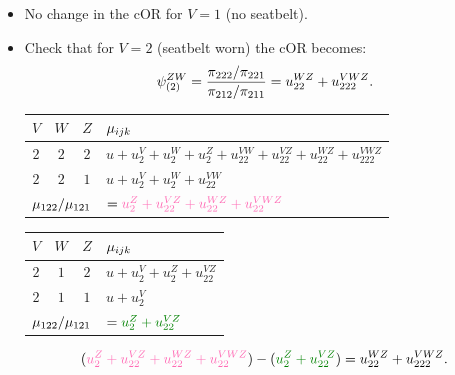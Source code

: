 \documentclass{article}\usepackage[]{graphicx}\usepackage[svgnames]{xcolor}
\let\exp\relax%
\let\log\relax%
\newcommand{\cOR}{\text{cOR}}%
\begin{document}
\begin{itemize}
    \item No change in the $ \cOR $ for $ V=1 $ (no seatbelt).
    \item Check that for $ V=2 $ (seatbelt worn) the $ \cOR $ becomes:
          \[ \psi_{(2)}^{ZW}=\frac{\pi_{222}/\pi_{221}}{\pi_{212}/\pi_{211}}=\exp{u_{22}^{WZ}+u_{222}^{VWZ}}. \]
          \begin{table}[H]
              \centering
              \begin{tabular}{cccl}
                  $ V $                                           & $ W $                                                               & $ Z $ & $ \log{\mu_{ijk}} $                                                       \\
                  \midrule
                  $2$                                             & $2$                                                                 & $2$   & $ u+u_2^V+u_2^W+u_2^Z+u_{22}^{VW}+u_{22}^{VZ}+u_{22}^{WZ}+u_{222}^{VWZ} $ \\
                  $2$                                             & $2$                                                                 & $1$   & $ u+u_2^V+u_2^W+u_{22}^{VW} $                                             \\
                  \midrule
                  \multicolumn{3}{c}{$\log{\mu_{122}/\mu_{121}}$} & $=\textcolor{HotPink}{u_2^Z+u_{22}^{VZ}+u_{22}^{WZ}+u_{22}^{VWZ}} $
              \end{tabular}
          \end{table}
          \begin{table}[H]
              \centering
              \begin{tabular}{cccl}
                  $ V $                                           & $ W $                                    & $ Z $ & $ \log{\mu_{ijk}} $           \\
                  \midrule
                  $2$                                             & $1$                                      & $2$   & $ u+u_2^V+u_2^Z+u_{22}^{VZ} $ \\
                  $2$                                             & $1$                                      & $1$   & $ u+u_2^V $                   \\
                  \midrule
                  \multicolumn{3}{c}{$\log{\mu_{122}/\mu_{121}}$} & $=\textcolor{Green}{u_2^Z+u_{22}^{VZ}} $
              \end{tabular}
          \end{table}
          \[ (\textcolor{HotPink}{u_2^Z+u_{22}^{VZ}+u_{22}^{WZ}+u_{22}^{VWZ}})-(\textcolor{Green}{u_2^Z+u_{22}^{VZ}})=u_{22}^{WZ}+u_{222}^{VWZ}. \]
\end{itemize}
\end{document}

